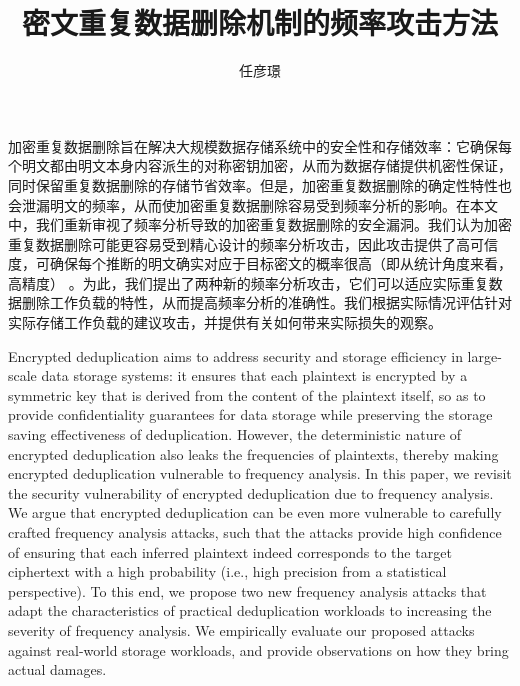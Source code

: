 \documentclass[bachelor]{thesis-uestc}
\title{密文重复数据删除机制的频率攻击方法}
\author{任彦璟}
\begin{document}
\makecover

\begin{chineseabstract}

加密重复数据删除旨在解决大规模数据存储系统中的安全性和存储效率：它确保每个明文都由明文本身内容派生的对称密钥加密，从而为数据存储提供机密性保证，同时保留重复数据删除的存储节省效率。但是，加密重复数据删除的确定性特性也会泄漏明文的频率，从而使加密重复数据删除容易受到频率分析的影响。在本文中，我们重新审视了频率分析导致的加密重复数据删除的安全漏洞。我们认为加密重复数据删除可能更容易受到精心设计的频率分析攻击，因此攻击提供了高可信度，可确保每个推断的明文确实对应于目标密文的概率很高（即从统计角度来看，高精度） 。为此，我们提出了两种新的频率分析攻击，它们可以适应实际重复数据删除工作负载的特性，从而提高频率分析的准确性。我们根据实际情况评估针对实际存储工作负载的建议攻击，并提供有关如何带来实际损失的观察。

\end{chineseabstract}

\begin{englishabstract}
Encrypted deduplication aims to address security and storage efficiency in large-scale data storage systems: it ensures that each plaintext is encrypted by a symmetric key that is derived from the content of the plaintext itself, so as to provide confidentiality guarantees for data storage while preserving the storage saving effectiveness of deduplication. However, the deterministic nature of encrypted deduplication also leaks the frequencies of plaintexts, thereby making encrypted deduplication vulnerable to frequency analysis. In this paper, we revisit the security vulnerability of encrypted deduplication due to frequency analysis. We argue that encrypted deduplication can be even more vulnerable to carefully crafted frequency analysis attacks, such that the attacks provide high confidence of ensuring that each inferred plaintext indeed corresponds to the target ciphertext with a high probability (i.e., high precision from a statistical perspective). To this end, we propose two new frequency analysis attacks that adapt the characteristics of practical deduplication workloads to increasing the severity of frequency analysis. We empirically evaluate our proposed attacks against real-world storage workloads, and provide observations on how they bring actual damages.

\end{englishabstract}
\end{document}
